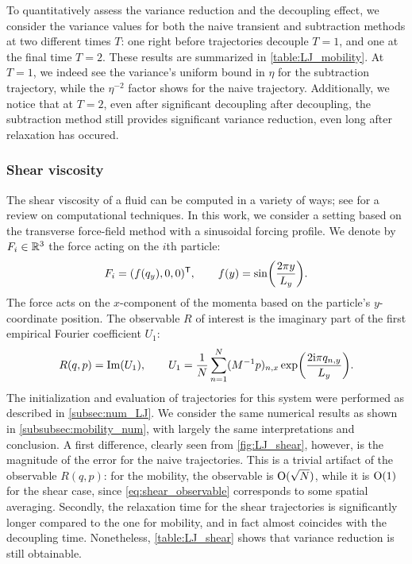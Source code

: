 To quantitatively assess the variance reduction and the decoupling effect, we consider the variance values for both the naive transient and subtraction methods at two different times $T$: one right before trajectories decouple $T=1$, and one at the final time $T=2$. These results are summarized in \cref{table:LJ_mobility}. At $T=1$, we indeed see the variance's uniform bound in $\eta$ for the subtraction trajectory, while the $\eta^{-2}$ factor shows for the naive trajectory. Additionally, we notice that at $T=2$, even after significant decoupling after decoupling, the subtraction method still provides significant variance reduction, even long after relaxation has occured.

\subsubsection{Shear viscosity}
\label{subsubsec:shear}
%
The shear viscosity of a fluid can be computed in a variety of ways; see \cite{todd2007} for a review on computational techniques. In this work, we consider a setting based on the transverse force-field method \cite{joubaud2012} with a sinusoidal forcing profile. We denote by $F_i\in\mathbb{R}^3$ the force acting on the $i$th particle:
%
\begin{equation}
    F_i = (f(q_y), 0, 0)^\t, \qquad  f(y) = \sin\paren*{\frac{2\pi y}{L_y}}.
\end{equation}
%
The force acts on the $x$-component of the momenta based on the particle's $y$-coordinate position.
%
%
%
The observable $R$ of interest is the imaginary part of the first empirical Fourier coefficient $U_1$:
%
\begin{equation}
    R(q,p) = \Im(U_1), \qquad U_1 = \frac{1}{N}\sum_{n=1}^N (M^{-1}p)_{n,x}\exp\paren*{\frac{2\mathrm{i}\pi q_{n,y}}{L_y}}.
    \label{eq:shear_observable}
\end{equation}
%
The initialization and evaluation of trajectories for this system were performed as described in \cref{subsec:num_LJ}. We consider the same numerical results as shown in \cref{subsubsec:mobility_num}, with largely the same interpretations and conclusion. A first difference, clearly seen from \cref{fig:LJ_shear}, however, is the magnitude of the error for the naive trajectories. This is a trivial artifact of the observable $R(q,p)$: for the mobility, the observable is $\mathrm{O}(\sqrt{N})$, while it is $\mathrm{O}(1)$ for the shear case, since \eqref{eq:shear_observable} corresponds to some spatial averaging. Secondly, the relaxation time for the shear trajectories is significantly longer compared to the one for mobility, and in fact almost coincides with the decoupling time. Nonetheless, \cref{table:LJ_shear} shows that variance reduction is still obtainable.
%


